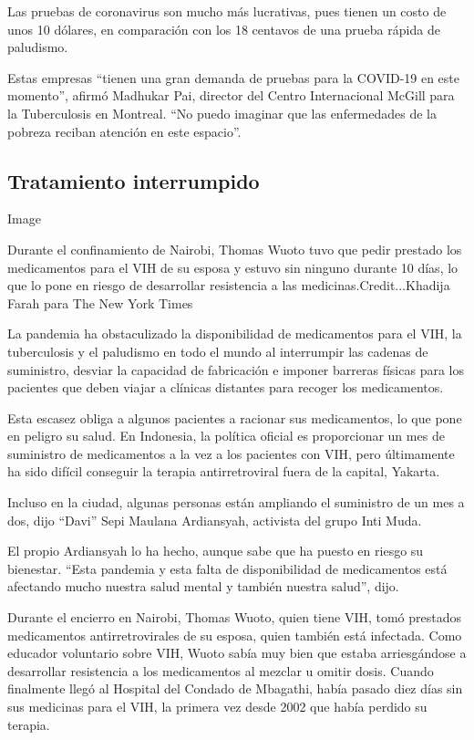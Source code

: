 Las pruebas de coronavirus son mucho más lucrativas, pues tienen un
costo de unos 10 dólares, en comparación con los 18 centavos de una
prueba rápida de paludismo.

Estas empresas ``tienen una gran demanda de pruebas para la COVID-19 en
este momento'', afirmó Madhukar Pai, director del Centro Internacional
McGill para la Tuberculosis en Montreal. ``No puedo imaginar que las
enfermedades de la pobreza reciban atención en este espacio''.

\hypertarget{tratamiento-interrumpido}{%
\subsection{Tratamiento interrumpido}\label{tratamiento-interrumpido}}

Image

Durante el confinamiento de Nairobi, Thomas Wuoto tuvo que pedir
prestado los medicamentos para el VIH de su esposa y estuvo sin ninguno
durante 10 días, lo que lo pone en riesgo de desarrollar resistencia a
las medicinas.Credit...Khadija Farah para The New York Times

La pandemia ha obstaculizado la disponibilidad de medicamentos para el
VIH, la tuberculosis y el paludismo en todo el mundo al interrumpir las
cadenas de suministro, desviar la capacidad de fabricación e imponer
barreras físicas para los pacientes que deben viajar a clínicas
distantes para recoger los medicamentos.

Esta escasez obliga a algunos pacientes a racionar sus medicamentos, lo
que pone en peligro su salud. En Indonesia, la política oficial es
proporcionar un mes de suministro de medicamentos a la vez a los
pacientes con VIH, pero últimamente ha sido difícil conseguir la terapia
antirretroviral fuera de la capital, Yakarta.

Incluso en la ciudad, algunas personas están ampliando el suministro de
un mes a dos, dijo ``Davi'' Sepi Maulana Ardiansyah, activista del grupo
Inti Muda.

El propio Ardiansyah lo ha hecho, aunque sabe que ha puesto en riesgo su
bienestar. ``Esta pandemia y esta falta de disponibilidad de
medicamentos está afectando mucho nuestra salud mental y también nuestra
salud'', dijo.

Durante el encierro en Nairobi, Thomas Wuoto, quien tiene VIH, tomó
prestados medicamentos antirretrovirales de su esposa, quien también
está infectada. Como educador voluntario sobre VIH, Wuoto sabía muy bien
que estaba arriesgándose a desarrollar resistencia a los medicamentos al
mezclar u omitir dosis. Cuando finalmente llegó al Hospital del Condado
de Mbagathi, había pasado diez días sin sus medicinas para el VIH, la
primera vez desde 2002 que había perdido su terapia.

